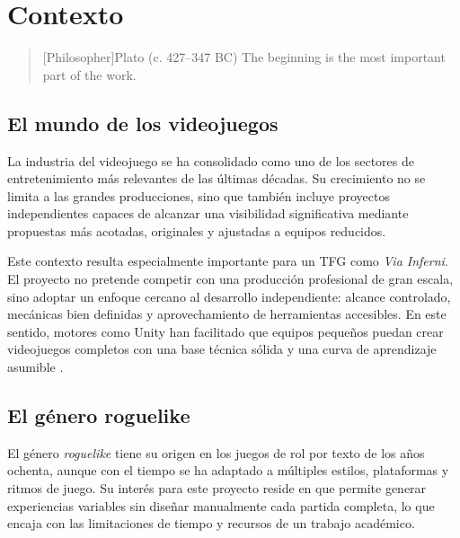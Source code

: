 \chapter{Contexto}

\begin{quotation}[Philosopher]{Plato (c. 427--347 BC)}
The beginning is the most important part of the work.
\end{quotation}

\begin{abstract}
En este capítulo se describe el marco contextual de \textit{Via Inferni}. Se presenta la
relevancia del videojuego independiente, se resumen las características principales del
género \textit{roguelike}, se revisan títulos de referencia y se explica el papel de la
\textit{Divina Comedia} como base temática del proyecto.
\end{abstract}

\section{El mundo de los videojuegos}

La industria del videojuego se ha consolidado como uno de los sectores de entretenimiento
más relevantes de las últimas décadas. Su crecimiento no se limita a las grandes
producciones, sino que también incluye proyectos independientes capaces de alcanzar una
visibilidad significativa mediante propuestas más acotadas, originales y ajustadas a
equipos reducidos.

Este contexto resulta especialmente importante para un TFG como \textit{Via Inferni}. El
proyecto no pretende competir con una producción profesional de gran escala, sino adoptar
un enfoque cercano al desarrollo independiente: alcance controlado, mecánicas bien
definidas y aprovechamiento de herramientas accesibles. En este sentido, motores como
Unity han facilitado que equipos pequeños puedan crear videojuegos completos con una base
técnica sólida y una curva de aprendizaje asumible \cite{unityLearnGettingStarted}.

\section{El género roguelike}

El género \textit{roguelike} tiene su origen en los juegos de rol por texto de los años
ochenta, aunque con el tiempo se ha adaptado a múltiples estilos, plataformas y ritmos de
juego. Su interés para este proyecto reside en que permite generar experiencias variables
sin diseñar manualmente cada partida completa, lo que encaja con las limitaciones de
tiempo y recursos de un trabajo académico.


